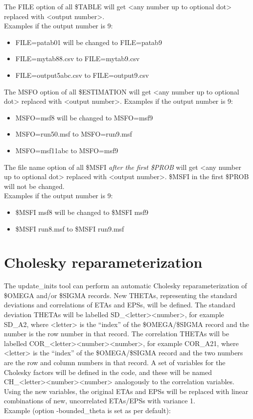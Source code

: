 The FILE option of all \$TABLE will get <any number up to optional dot> replaced with <output number>.\\
Examples if the output number is 9:
\begin{itemize}
\item FILE=patab01 will be changed to FILE=patab9
\item FILE=mytab88.csv to FILE=mytab9.csv
\item FILE=output5abc.csv to FILE=output9.csv
\end{itemize}

\noindent The MSFO option of all \$ESTIMATION will get <any number up to optional dot> replaced with <output number>. 
Examples if the output number is 9:
\begin{itemize}
\item MSFO=msf8 will be changed to MSFO=msf9
\item MSFO=run50.msf to MSFO=run9.msf
\item MSFO=msf11abc to MSFO=msf9
\end{itemize}

\noindent The file name option of all \$MSFI \emph{after the first \$PROB} will get <any number up to optional dot> replaced with <output number>. \$MSFI in the first \$PROB will not be changed.\\
Examples if the output number is 9:
\begin{itemize}
\item \$MSFI msf8 will be changed to \$MSFI msf9
\item \$MSFI run8.msf to \$MSFI run9.msf
\end{itemize}

\section{Cholesky reparameterization}
The update\_inits tool can perform an automatic Cholesky reparameterization of \$OMEGA and/or \$SIGMA records. New THETAs, representing the standard deviations and correlations of ETAs and EPSs, will be defined. The standard deviation THETAs will be labelled SD\_<letter><number>, for example SD\_A2, where <letter> is the ``index'' of the \$OMEGA/\$SIGMA record and the number is the row number in that record. 
The correlation THETAs will be labelled COR\_<letter><number><number>, for example COR\_A21,  where <letter> is the ``index'' of the \$OMEGA/\$SIGMA record and the two numbers are the row and column numbers in that record. A set of variables for the Cholesky factors will be defined in the code, and these will be named CH\_<letter><number><number> analogously to the correlation variables.
Using the new variables, the original ETAs and EPSs will be replaced with linear combinations of new, uncorrelated ETAs/EPSs with variance 1.\\
Example (option -bounded\_theta is set as per default):

